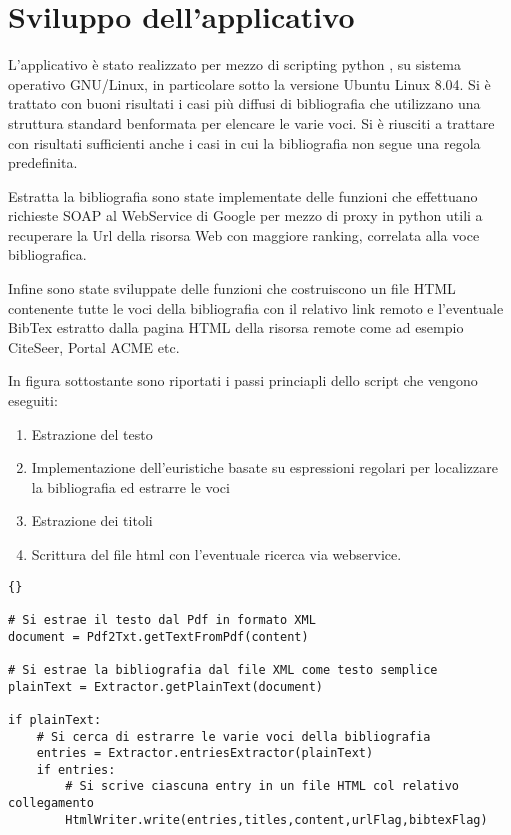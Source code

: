 \section{Sviluppo dell'applicativo} \label{software}

L'applicativo è stato realizzato per mezzo di scripting python \cite{pydoc}, su sistema operativo GNU/Linux, in particolare sotto la versione Ubuntu Linux 8.04. Si è trattato con buoni risultati i casi più diffusi di bibliografia che utilizzano una struttura standard benformata per elencare le varie voci. Si è riusciti a trattare con risultati sufficienti anche i casi in cui la bibliografia non segue una regola predefinita.

Estratta la bibliografia sono state implementate delle funzioni che effettuano richieste SOAP al WebService di Google \cite{GWS} per mezzo di proxy in python \cite{ibm-py-ws} utili a recuperare la Url della risorsa Web con maggiore ranking, correlata alla voce bibliografica. 

Infine sono state sviluppate delle funzioni che costruiscono un file HTML contenente tutte le voci della bibliografia con il relativo link remoto e l'eventuale BibTex estratto dalla pagina HTML della risorsa remote come ad esempio CiteSeer, Portal ACME etc.

In figura sottostante sono riportati i passi princiapli dello script che vengono eseguiti:
\begin{enumerate}
	\item Estrazione del testo
	\item Implementazione dell'euristiche basate su espressioni regolari per localizzare la bibliografia ed estrarre le voci
	\item Estrazione dei titoli
	\item Scrittura del file html con l'eventuale ricerca via webservice. 
\end{enumerate}


\begin{lstlisting}[frame=r,caption=Il File principale - pdftoref.py ,breaklines=true,basicstyle=\small]{}

# Si estrae il testo dal Pdf in formato XML
document = Pdf2Txt.getTextFromPdf(content)

# Si estrae la bibliografia dal file XML come testo semplice
plainText = Extractor.getPlainText(document)

if plainText:
	# Si cerca di estrarre le varie voci della bibliografia 
	entries = Extractor.entriesExtractor(plainText)
	if entries:
		# Si scrive ciascuna entry in un file HTML col relativo collegamento
		HtmlWriter.write(entries,titles,content,urlFlag,bibtexFlag)

\end{lstlisting}

